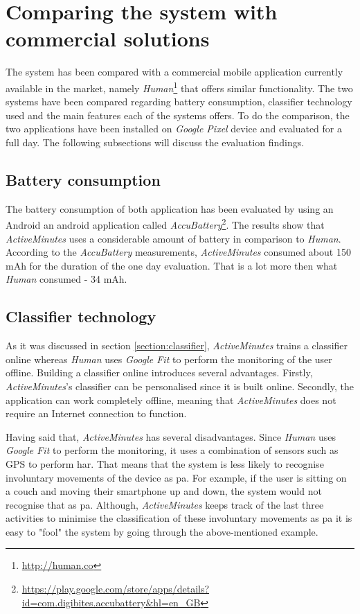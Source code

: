 \section{Comparing the system with commercial solutions}
The system has been compared with a commercial mobile application currently available in the market, namely \textit{Human}\footnote{\url{http://human.co}} that offers similar functionality. The two systems have been compared regarding battery consumption, classifier technology used and the main features each of the systems offers. To do the comparison, the two applications have been installed on \textit{Google Pixel} device and evaluated for a full day. The following subsections will discuss the evaluation findings.

\subsection{Battery consumption}
The battery consumption of both application has been evaluated by using an Android an android application called \textit{AccuBattery}\footnote{\url{https://play.google.com/store/apps/details?id=com.digibites.accubattery&hl=en_GB}}. The results show that \textit{ActiveMinutes} uses a considerable amount of battery in comparison to \textit{Human}. According to the \textit{AccuBattery} measurements, \textit{ActiveMinutes} consumed about 150 mAh for the duration of the one day evaluation. That is a lot more then what \textit{Human} consumed - 34 mAh.

\subsection{Classifier technology}
As it was discussed in section \ref{section:classifier}, \textit{ActiveMinutes} trains a classifier online whereas \textit{Human} uses \textit{Google Fit} to perform the monitoring of the user offline. Building a classifier online introduces several advantages. Firstly, \textit{ActiveMinutes}'s classifier can be personalised since it is built online. Secondly, the application can work completely offline, meaning that \textit{ActiveMinutes} does not require an Internet connection to function. 

Having said that, \textit{ActiveMinutes} has several disadvantages. Since \textit{Human} uses \textit{Google Fit} to perform the monitoring, it uses a combination of sensors such as GPS to perform \gls{har}. That means that the system is less likely to recognise involuntary movements of the device as \gls{pa}. For example, if the user is sitting on a couch and moving their smartphone up and down, the system would not recognise that as \gls{pa}. Although, \textit{ActiveMinutes} keeps track of the last three activities to minimise the classification of these involuntary movements as \gls{pa} it is easy to "fool" the system by going through the above-mentioned example.

